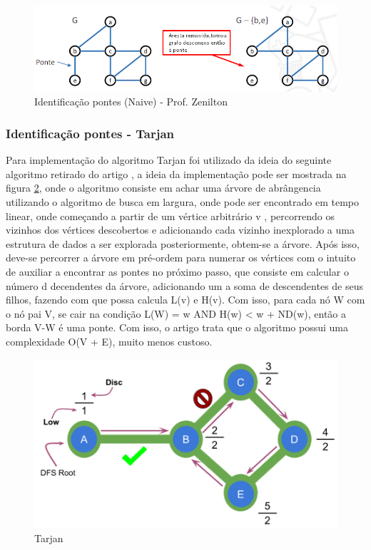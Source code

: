 \newpage
\begin{figure}[ht]
    \centering
    \includegraphics[width=.9\textwidth]{figuras/naive.png}
    \caption{Identificação pontes (Naive) - Prof. Zenilton}
    \label{fig:figure6}
\end{figure}

\subsubsection{\esp Identificação pontes - Tarjan}
Para implementação do algoritmo Tarjan foi utilizado da ideia do seguinte algoritmo retirado do artigo \cite{tarjan}, a ideia da implementação pode ser mostrada na figura \ref{fig:figure9}, onde o algoritmo consiste em achar uma árvore de abrângencia \cite{spanning} utilizando o algoritmo de busca em largura, onde pode ser encontrado em tempo linear, onde começando a partir de um vértice arbitrário v , percorrendo os vizinhos dos vértices descobertos e adicionando cada vizinho inexplorado a uma estrutura de dados a ser explorada posteriormente, obtem-se a árvore. Após isso, deve-se percorrer a árvore em pré-ordem \cite{tree_traversal} para numerar os vértices com o intuito de auxiliar a encontrar as pontes no próximo passo, que consiste em calcular o número d decendentes da árvore, adicionando um a soma de descendentes de seus filhos, fazendo com que possa calcula L(v) e H(v). Com isso, para cada nó W com o nó pai V, se cair na condição L(W) = w AND H(w) < w + ND(w), então a borda V-W é uma ponte. Com isso, o artigo trata que o algoritmo possui uma complexidade O(V + E), muito menos custoso.

\begin{figure}[ht]
    \centering
    \includegraphics[width=.8\textwidth]{figuras/tarjan_1974.png}
    \caption{Tarjan \cite{tarjan_code}}
    \label{fig:figure9}
\end{figure}

